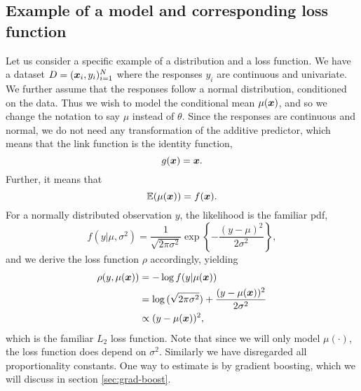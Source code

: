 \subsection{Example of a model and corresponding loss function}\label{subsec:model-example}
Let us consider a specific example of a distribution and a loss function.
We have a dataset $D=(\bm{x}_i,y_i)_{i=1}^N$ where the responses $y_i$ are continuous and univariate.
We further assume that the responses follow a normal distribution, conditioned on the data.
Thus we wish to model the conditional mean $\mu(\bm{x})$, and so we change the notation to say $\mu$ instead of $\theta$.
Since the responses are continuous and normal, we do not need any transformation of the additive predictor, which means that the link function is the identity function,
\begin{equation*}
    g(\bm{x})=\bm{x}.
\end{equation*}
Further, it means that
\begin{equation*}
    \mathbb{E}(\mu(\bm{x}))=f(\bm{x}).
\end{equation*}
For a normally distributed observation $y$, the likelihood is the familiar pdf,
\begin{equation*}
    f(y|\mu,\sigma^2)=\frac{1}{\sqrt{2\pi\sigma^2}}\exp\left\{-\frac{(y-\mu)^2}{2\sigma^2}\right\},
\end{equation*}
and we derive the loss function $\rho$ accordingly, yielding
\begin{align*}
    \rho(y,\mu(\bm{x}))&=-\log{f(y|\mu(\bm{x}))}\\
    &=\log{(\sqrt{2\pi\sigma^2})}+\frac{(y-\mu(\bm{x}))^2}{2\sigma^2} \\
    &\propto(y-\mu(\bm{x}))^2,
\end{align*}
which is the familiar $L_2$ loss function. Note that since we will only model $\mu(\cdot)$, the loss function does depend on $\sigma^2$.
Similarly we have disregarded all proportionality constants.
One way to estimate is by gradient boosting, which we will discuss in section \ref{sec:grad-boost}.

